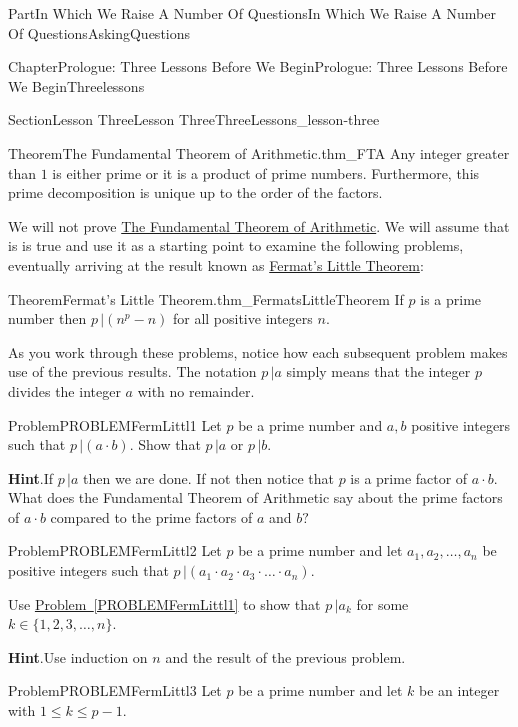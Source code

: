 \documentclass[oneside,10pt,]{book}
\newcommand{\blocktitlefont}{\relax}
\newcommand{\xreffont}{\relax}
\numberwithin{equation}{part}
\begin{document}
\begin{partptx}{Part}{In Which We Raise A Number Of Questions}{}{In Which We Raise A Number Of Questions}{}{}{AskingQuestions}
\begin{chapterptx}{Chapter}{Prologue: Three Lessons Before We Begin}{}{Prologue: Three Lessons Before We Begin}{}{}{Threelessons}
\begin{sectionptx}{Section}{Lesson Three}{}{Lesson Three}{}{}{ThreeLessons_lesson-three}
\begin{theorem}{Theorem}{The Fundamental Theorem of Arithmetic.}{}{thm_FTA}%
Any integer greater than \(1\) is either prime or it is a product of prime numbers.  Furthermore, this prime decomposition is unique up to the order of the factors.%
\end{theorem}
We will not prove \hyperref[thm_FTA]{The Fundamental Theorem of Arithmetic}. We will assume that is is true and use it as a starting point to examine the following problems, eventually arriving at the result known as \hyperref[thm_FermatsLittleTheorem]{Fermat's Little Theorem}:%
\begin{theorem}{Theorem}{Fermat's Little Theorem.}{}{thm_FermatsLittleTheorem}%
%
If \(p\) is a prime number then \(p\,|(n^p-n)\) for all positive integers \(n\).%
\end{theorem}
As you work through these problems, notice how each subsequent problem makes use of the previous results. The notation \(p\,|a\) simply means that the integer \(p\) divides the integer \(a\) with no remainder.%
\begin{problem}{Problem}{}{PROBLEMFermLittl1}%
Let \(p\) be a prime number and \(a, b\) positive integers such that \(p\, | (a\cdot b)\).  Show that \(p\,|a\) or \(p\,|b\).%
\par\smallskip%
\noindent\textbf{\blocktitlefont Hint}.\hypertarget{PROBLEMFermLittl1-3}{}\quad{}If \(p\,|a\) then we are done.  If not then notice that \(p\) is a prime factor of \(a\cdot b\).  What does the Fundamental Theorem of Arithmetic say about the prime factors of \(a\cdot b\) compared to the prime factors of \(a\) and \(b?\)%
\end{problem}
\begin{problem}{Problem}{}{PROBLEMFermLittl2}%
Let \(p\) be a prime number and let \(a_1, a_2, \ldots,
a_n\) be positive integers such that \(p\,|\left(a_1\cdot
a_2\cdot a_3\cdot\ldots\cdot a_n\right)\).%
\par
Use \hyperref[PROBLEMFermLittl1]{Problem~{\xreffont\ref{PROBLEMFermLittl1}}} to show that \(p\,|a_k\) for some \(k\in\{1, 2, 3, \ldots, n\}\).%
\par\smallskip%
\noindent\textbf{\blocktitlefont Hint}.\hypertarget{PROBLEMFermLittl2-3}{}\quad{}Use induction on \(n\) and the result of the previous problem.%
\end{problem}
\begin{problem}{Problem}{}{PROBLEMFermLittl3}%
Let \(p\) be a prime number and let \(k\) be an integer with \(1\le k\le p-1\).%

\end{problem}
\end{sectionptx}
\end{chapterptx}
\end{partptx}
\end{document}
